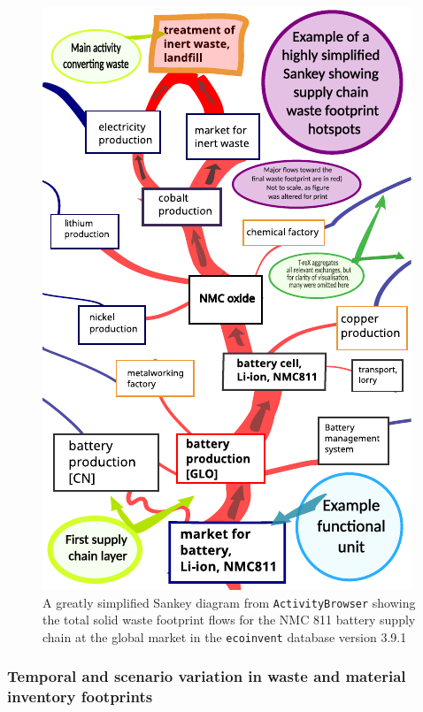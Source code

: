 \documentclass[a4paper,fleqn]{cas-dc}
\begin{document}
\begin{figure}[!htbp]
	\centering
	\includegraphics[width=0.8\columnwidth]{figs/T-reX_NMC811_WasteTotalSolid.pdf}
	\caption{A greatly simplified Sankey diagram from \texttt{ActivityBrowser} showing the total solid waste footprint flows for the
	 NMC 811 battery supply chain at the global market in the \texttt{ecoinvent} database version 3.9.1}\label{fig:sankey_waste}
\end{figure} 


\subsubsection{Temporal and scenario variation in waste and material inventory footprints}

\end{document}
